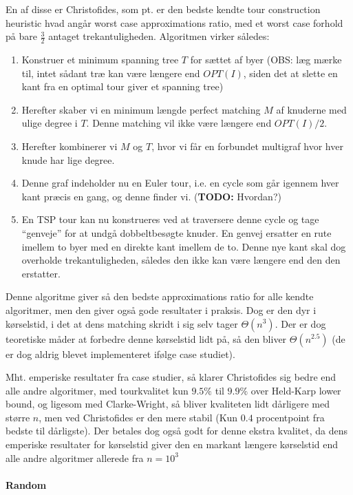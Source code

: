 En af disse er Christofides, som pt. er den bedste kendte tour construction heuristic hvad angår worst case approximations ratio, med et worst case forhold på bare $\frac{3}{2}$ antaget trekantuligheden. Algoritmen virker således:
\begin{enumerate}
 \item Konstruer et minimum spanning tree $T$ for sættet af byer (OBS: læg mærke til, intet sådant træ kan være længere end $OPT(I)$, siden det at slette en kant fra en optimal tour giver et spanning tree)
 \item Herefter skaber vi en minimum længde perfect matching $M$ af knuderne med ulige degree i $T$. Denne matching vil ikke være længere end $OPT(I)/2$.
 \item Herefter kombinerer vi $M$ og $T$, hvor vi får en forbundet multigraf hvor hver knude har lige degree.
 \item Denne graf indeholder nu en Euler tour, i.e. en cycle som går igennem hver kant præcis en gang, og denne finder vi. (\textbf{TODO: } Hvordan?)
 \item En TSP tour kan nu konstrueres ved at traversere denne cycle og tage ``genveje'' for at undgå dobbeltbesøgte knuder. En genvej ersatter en rute imellem to byer med en direkte kant imellem de to. Denne nye kant skal dog overholde trekantuligheden, således den ikke kan være længere end den den erstatter. 
\end{enumerate}

Denne algoritme giver så den bedste approximations ratio for alle kendte algoritmer, men den giver også gode resultater i praksis. Dog er den dyr i kørselstid, i det at dens matching skridt i sig selv tager $\Theta(n^3)$. Der er dog teoretiske måder at forbedre denne kørselstid lidt på, så den bliver $\Theta(n^{2.5})$ (de er dog aldrig blevet implementeret ifølge case studiet).

Mht. emperiske resultater fra case studier, så klarer Christofides sig bedre end alle andre algoritmer, med tourkvalitet kun $9.5\%$ til $9.9\%$ over Held-Karp lower bound, og ligesom med Clarke-Wright, så bliver kvaliteten lidt dårligere med større $n$, men ved Christofides er den mere stabil (Kun $0.4$ procentpoint fra bedste til dårligste). Der betales dog også godt for denne ekstra kvalitet, da dens emperiske resultater for kørselstid giver den en markant længere kørselstid end alle andre algoritmer allerede fra $n=10^{3}$


\paragraph{Random}
~\\
~\\


